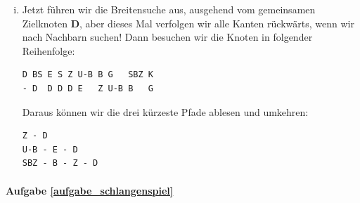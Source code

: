 \begin{enumerate}[(a)]
\begin{enumerate}[(i)]
\item Jetzt führen wir die Breitensuche aus, ausgehend vom gemeinsamen Zielknoten \textbf{D}, aber dieses Mal verfolgen wir alle Kanten rückwärts, wenn wir nach Nachbarn suchen!
Dann besuchen wir die Knoten in folgender Reihenfolge:
\begin{lstlisting}[mathescape]
D BS E S Z U-B B G   SBZ K
- D  D D D E   Z U-B B   G
\end{lstlisting}
Daraus können wir die drei kürzeste Pfade ablesen und umkehren:
\begin{lstlisting}[mathescape]
Z - D
U-B - E - D
SBZ - B - Z - D
\end{lstlisting}
\end{enumerate}
\end{enumerate}

\paragraph{Aufgabe \ref{aufgabe_schlangenspiel}}
